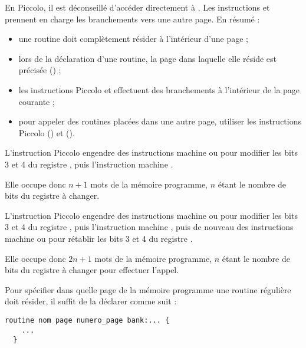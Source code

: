 En Piccolo, il est déconseillé d'accéder directement à . Les instructions  et  prennent en charge les branchements vers une autre page. En résumé :
\begin{itemize}
  \item une routine doit complètement résider à l'intérieur d'une page ;
  \item lors de la déclaration d'une routine, la page dans laquelle elle réside est précisée () ;
  \item les instructions Piccolo  et  effectuent des branchements à l'intérieur de la page courante ;
  \item pour appeler des routines placées dans une autre page, utiliser les instructions Piccolo  () et  ().
\end{itemize}




L'instruction Piccolo  engendre des instructions machine  ou  pour modifier les bits 3 et 4 du registre , puis l'instruction machine .

Elle occupe donc $n+1$ mots de la mémoire programme, $n$ étant le nombre de bits du registre  à changer.





L'instruction Piccolo   engendre des instructions machine  ou  pour modifier les bits 3 et 4 du registre , puis l'instruction machine , puis de nouveau des instructions machine  ou  pour rétablir les bits 3 et 4 du registre .

Elle occupe donc $2n+1$ mots de la mémoire programme, $n$ étant le nombre de bits du registre  à changer pour effectuer l'appel.


Pour spécifier dans quelle page de la mémoire programme une routine régulière doit résider, il suffit de la déclarer comme suit :
\begin{lstlisting}[language=piccolo]
  routine nom page numero_page bank:... {
    ...
  }
\end{lstlisting}

